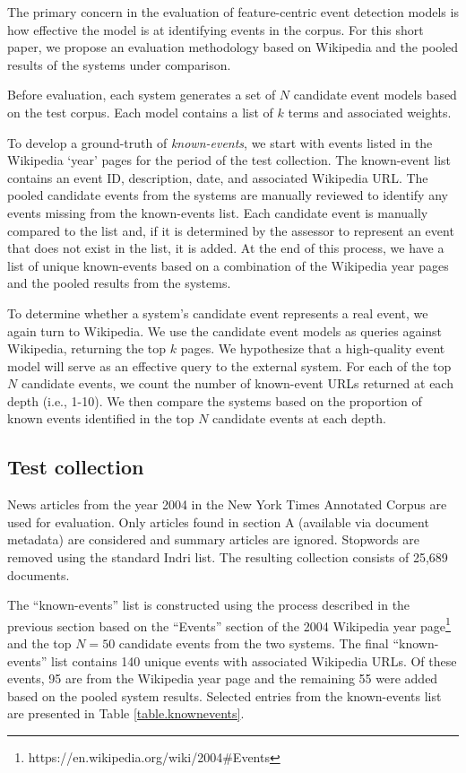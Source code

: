 \documentclass{sig-alternate}
\begin{document}
The primary concern in the evaluation of feature-centric event detection models is how effective the model is at identifying events in the corpus. For this short paper, we propose an evaluation methodology based on Wikipedia and the pooled results of the systems under comparison.

Before evaluation, each system generates a set of $N$ candidate event models based on the test corpus. Each model contains a list of $k$ terms and associated weights. 

To develop a ground-truth of \emph{known-events}, we start with events listed in the Wikipedia `year' pages for the period of the test collection. The known-event list contains an event ID, description, date, and associated Wikipedia URL. The pooled candidate events from the systems are manually reviewed to identify any events missing from the known-events list.  Each candidate event is manually compared to the list and, if it is determined by the assessor to represent an event that does not exist in the list, it is added. At the end of this process, we have a list of unique known-events based on a combination of the Wikipedia year pages and the pooled results from the systems.  

To determine whether a system's candidate event represents a real event, we again turn to Wikipedia. We use the candidate event models as queries against Wikipedia, returning the top $k$ pages. We hypothesize that a high-quality event model will serve as an effective query to the external system. For each of the top $N$ candidate events, we count the number of known-event URLs returned at each depth (i.e., 1-10). We then compare the systems based on the proportion of known events identified in the top $N$ candidate events at each depth.


\subsection{Test collection}
News articles from the year 2004 in the New York Times Annotated Corpus \cite{Sandhaus2008} are used for evaluation. Only articles found in section A (available via document metadata) are considered and summary articles are ignored. Stopwords are removed using the standard Indri list. The resulting collection consists of 25,689 documents.

The ``known-events'' list is constructed using the process described in the previous section based on the ``Events'' section of the 2004 Wikipedia year page\footnote{https://en.wikipedia.org/wiki/2004\#Events} and the top $N=50$ candidate events from the two systems.  The final ``known-events'' list contains 140 unique events with associated Wikipedia URLs. Of these events, 95 are from the Wikipedia year page and the remaining 55 were added based on the pooled system results.  Selected entries from the known-events list are presented in Table \ref{table.knownevents}.
\end{document}
